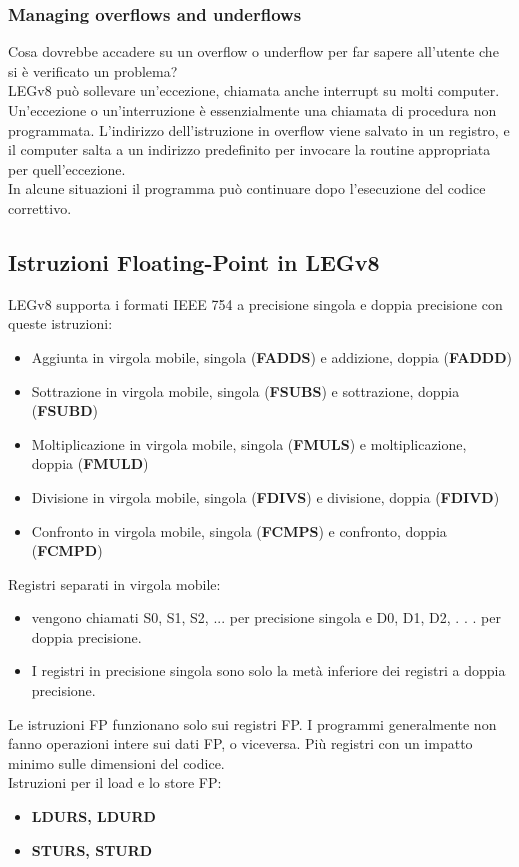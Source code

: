 \documentclass[12pt,a4paper]{article}
\begin{document}
\subsubsection{Managing overflows and underflows}
Cosa dovrebbe accadere su un overflow o underflow per far sapere all'utente che si è verificato un problema?\\
LEGv8 può sollevare un'eccezione, chiamata anche interrupt su molti computer. Un'eccezione o un'interruzione è essenzialmente una chiamata di procedura non programmata. L'indirizzo dell'istruzione in overflow viene salvato in un registro, e il computer salta a un indirizzo predefinito per invocare la routine appropriata per quell'eccezione.\\
In alcune situazioni il programma può continuare dopo l'esecuzione del codice correttivo.

\subsection{Istruzioni Floating-Point in LEGv8}
LEGv8 supporta i formati IEEE 754 a precisione singola e doppia precisione con queste istruzioni:
\begin{itemize}
\item Aggiunta in virgola mobile, singola (\textbf{FADDS}) e addizione, doppia (\textbf{FADDD})
\item Sottrazione in virgola mobile, singola (\textbf{FSUBS}) e sottrazione, doppia (\textbf{FSUBD})
\item Moltiplicazione in virgola mobile, singola (\textbf{FMULS}) e moltiplicazione, doppia (\textbf{FMULD})
\item Divisione in virgola mobile, singola (\textbf{FDIVS}) e divisione, doppia (\textbf{FDIVD})
\item Confronto in virgola mobile, singola (\textbf{FCMPS}) e confronto, doppia (\textbf{FCMPD})
\end{itemize}
Registri separati in virgola mobile:
\begin{itemize}
\item vengono chiamati S0, S1, S2, ... per precisione singola e D0, D1, D2, . . . per doppia precisione.
\item I registri in precisione singola sono solo la metà inferiore dei registri a doppia precisione.
\end{itemize}
Le istruzioni FP funzionano solo sui registri FP. I programmi generalmente non fanno operazioni intere sui dati FP, o viceversa. Più registri con un impatto minimo sulle dimensioni del codice.\\
Istruzioni per il load e lo store FP:
\begin{itemize}
\item \textbf{LDURS, LDURD}
\item \textbf{STURS, STURD}
\end{itemize}
\end{document}
